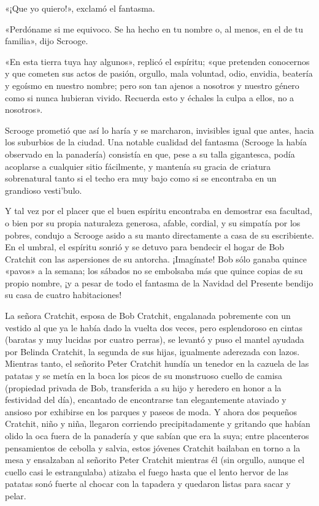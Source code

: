 \documentclass{novela}
\begin{document}
 «¡Que yo quiero!», exclamó el fantasma.

 «Perdóname si me equivoco. Se ha hecho en tu nombre o, al menos, en el de tu familia», dijo Scrooge.

 «En esta tierra tuya hay algunos», replicó el espíritu; «que pretenden conocernos y que cometen sus actos de pasión, orgullo, mala voluntad, odio, envidia, beatería y egoísmo en nuestro nombre; pero son tan ajenos a nosotros y nuestro género como si nunca hubieran vivido. Recuerda esto y échales la culpa a ellos, no a nosotros».

 Scrooge prometió que así lo haría y se marcharon, invisibles igual que antes, hacia los suburbios de la ciudad. Una notable cualidad del fantasma (Scrooge la había observado en la panadería) consistía en que, pese a su talla gigantesca, podía acoplarse a cualquier sitio fácilmente, y mantenía su gracia de criatura sobrenatural tanto si el techo era muy bajo como si se encontraba en un grandioso vesti'bulo.

 Y tal vez por el placer que el buen espíritu encontraba en demostrar esa facultad, o bien por su propia naturaleza generosa, afable, cordial, y su simpatía por los pobres, condujo a Scrooge asido a su manto directamente a casa de su escribiente. En el umbral, el espíritu sonrió y se detuvo para bendecir el hogar de Bob Cratchit con las aspersiones de su antorcha. ¡Imagínate! Bob sólo ganaba quince «pavos» a la semana; los sábados no se embolsaba más que quince copias de su propio nombre, ¡y a pesar de todo el fantasma de la Navidad del Presente bendijo su casa de cuatro habitaciones!

 La señora Cratchit, esposa de Bob Cratchit, engalanada pobremente con un vestido al que ya le había dado la vuelta dos veces, pero esplendoroso en cintas (baratas y muy lucidas por cuatro perras), se levantó y puso el mantel ayudada por Belinda Cratchit, la segunda de sus hijas, igualmente aderezada con lazos. Mientras tanto, el señorito Peter Cratchit hundía un tenedor en la cazuela de las patatas y se metía en la boca los picos de su monstruoso cuello de camisa (propiedad privada de Bob, transferida a su hijo y heredero en honor a la festividad del día), encantado de encontrarse tan elegantemente ataviado y ansioso por exhibirse en los parques y paseos de moda. Y ahora dos pequeños Cratchit, niño y niña, llegaron corriendo precipitadamente y gritando que habían olido la oca fuera de la panadería y que sabían que era la suya; entre placenteros pensamientos de cebolla y salvia, estos jóvenes Cratchit bailaban en torno a la mesa y ensalzaban al señorito Peter Cratchit mientras él (sin orgullo, aunque el cuello casi le estrangulaba) atizaba el fuego hasta que el lento hervor de las patatas sonó fuerte al chocar con la tapadera y quedaron listas para sacar y pelar.
\end{document}
